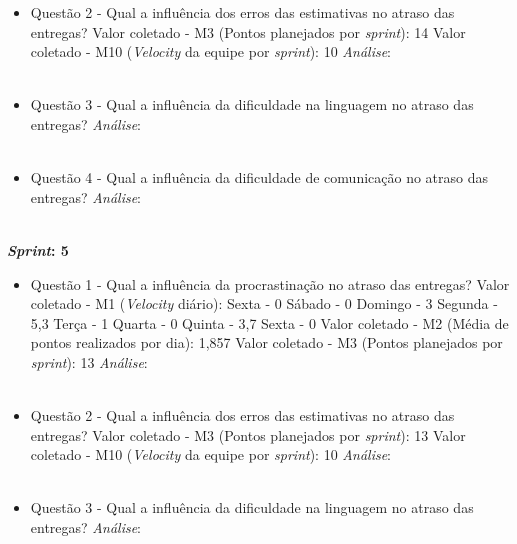 \begin{apendicesenv}
\begin{itemize}
	  \item Questão 2 - Qual a influência dos erros das estimativas no atraso das entregas? 
	    \subitem Valor coletado - M3 (Pontos planejados por \textit{sprint}): 14 
	    \subitem Valor coletado - M10 (\textit{Velocity} da equipe por \textit{sprint}): 10
	    \subitem \textit{Análise}:
	    \\
	    \\
	    
	  \item Questão 3 - Qual a influência da dificuldade na linguagem no atraso das entregas?
	    \subitem \textit{Análise}:
	  \\
	  \\
	  
	  \item Questão 4 - Qual a influência da dificuldade de comunicação no atraso das entregas?
	    \subitem \textit{Análise}:
	  \\
	  \\
	  
	\end{itemize}
	    \vfill
	    \pagebreak
	\textbf{\textit{Sprint}: 5}
	
	\begin{itemize}
	  
	  \item Questão 1 - Qual a influência da procrastinação no atraso das entregas?
	    \subitem Valor coletado - M1 (\textit{Velocity} diário):
	      \subsubitem Sexta - 0
	      \subsubitem Sábado - 0 
	      \subsubitem Domingo - 3
	      \subsubitem Segunda - 5,3
	      \subsubitem Terça - 1
	      \subsubitem Quarta - 0
	      \subsubitem Quinta - 3,7
	      \subsubitem Sexta - 0
	    \subitem Valor coletado - M2 (Média de pontos realizados por dia): 1,857
	    \subitem Valor coletado - M3 (Pontos planejados por \textit{sprint}): 13
	    \subitem \textit{Análise}:
	    \\
	    \\

	  \item Questão 2 - Qual a influência dos erros das estimativas no atraso das entregas? 
	    \subitem Valor coletado - M3 (Pontos planejados por \textit{sprint}): 13
	    \subitem Valor coletado - M10 (\textit{Velocity} da equipe por \textit{sprint}): 10
	    \subitem \textit{Análise}:
	    \\
	    \\
	    
	  \item Questão 3 - Qual a influência da dificuldade na linguagem no atraso das entregas?
	    \subitem \textit{Análise}:
	  \\
	  \\
	  

\end{itemize}
\end{apendicesenv}
